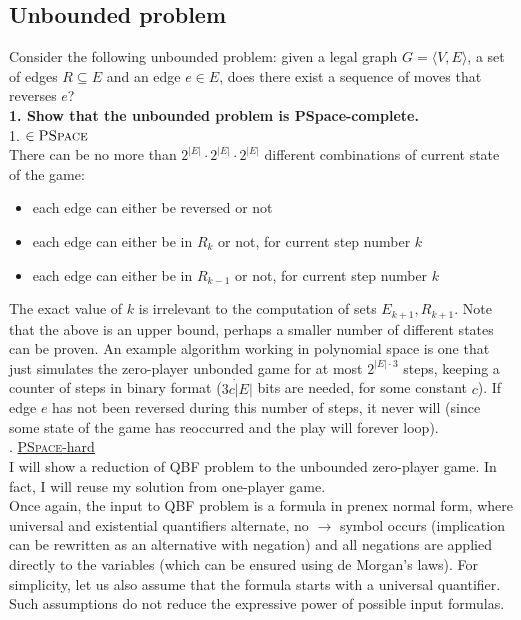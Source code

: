\subsection*{Unbounded problem}
Consider the following unbounded problem: given a legal graph $G = \langle V, E \rangle$,
a set of edges $R \subseteq E$ and an edge $e \in E$, does there exist a sequence of moves
that reverses $e$?\\
\textbf{1. Show that the unbounded problem is PSpace-complete.}\\
1. \underline{$\in \textsc{PSpace}$}\\
There can be no more than $2^{|E|} \cdot 2^{|E|} \cdot 2^{|E|}$ different combinations of current state of the game:
\begin{itemize}
      \item each edge can either be reversed or not
      \item each edge can either be in $R_k$ or not, for current step number $k$ 
      \item each edge can either be in $R_{k-1}$ or not, for current step number $k$ 
\end{itemize}
The exact value of $k$ is irrelevant to the computation of sets $E_{k+1}, R_{k+1}$. Note that
the above is an upper bound, perhaps a smaller number of different states can be proven.
An example algorithm working in polynomial space is one that just simulates the zero-player unbonded game for
at most $2^{|E| \cdot 3}$ steps, keeping a counter of steps in binary format ($3c \dot |E|$ bits are needed, for some constant $c$).
If edge $e$ has not been reversed during this number of steps, it never will (since some state of the game
has reoccurred and the play will forever loop).\\

. \underline{\textsc{PSpace}-hard}\\
I will show a reduction of QBF problem to the unbounded zero-player game. In fact, I will reuse my
solution from one-player game.\\
Once again, the input to QBF problem is a formula in prenex normal form, where universal and existential quantifiers
alternate, no $\rightarrow$ symbol occurs (implication can be rewritten as an alternative with negation)
and all negations are applied directly to the variables (which can be ensured using de Morgan's laws).
For simplicity, let us also assume that the formula starts with a universal quantifier.
Such assumptions do not reduce the expressive power of possible input formulas.

